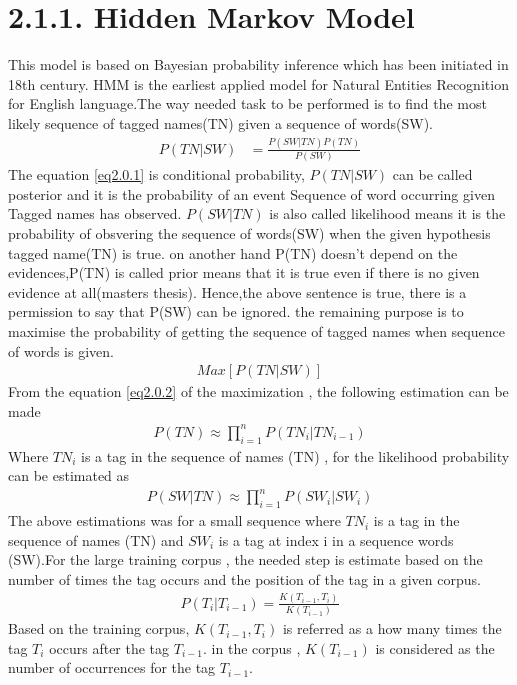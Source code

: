 \section*{2.1.1. Hidden Markov Model}
This model is based on Bayesian probability inference which has been initiated in 18th century. HMM is the earliest applied model for Natural Entities Recognition for English language.The way needed task to be performed is to find the most likely sequence of tagged names(TN) given a sequence of words(SW).
\begin{align}
P(TN|SW) & = \frac{P(SW|TN)P(TN)}{P(SW)}\label{eq2.0.1}
\end{align}
The equation  \eqref{eq2.0.1} is conditional probability, $P(TN|SW)$ can be  called posterior and it is  the probability of an event Sequence of word occurring given Tagged names has observed. 
$P(SW|TN)$ is also called likelihood means it is the probability of obsvering the sequence of words(SW) when the given hypothesis tagged name(TN) is true. on another hand P(TN) doesn't depend on the evidences,P(TN) is called prior means that it is true even if there is no given evidence at all(masters thesis).
Hence,the above sentence is true, there is a permission to say  that P(SW) can be ignored. the remaining purpose is to maximise the probability of getting the sequence of tagged names when sequence of words is given.
\begin{align}
Max\left[P(TN|SW)\right] \label{eq2.0.2}
\end{align}
From the equation  \eqref{eq2.0.2} of the maximization , the following estimation can be made
\begin{align}
P(TN){\approx} \prod_{i=1}^{n} P({TN}_{i}|{TN}_{i-1}) \label{2.0.3}
\end{align}
Where ${TN}_{i}$ is a tag in the sequence of names (TN) , for the likelihood probability can be estimated as 
\begin{align}
P(SW|TN){\approx} \prod_{i=1}^{n} P({SW}_{i}|{SW}_{i})\label{2.0.4}
\end{align}
The above estimations was for a small sequence where ${TN}_{i}$ is a tag in the sequence of names (TN) and ${SW}_{i}$ is a tag at index i in a sequence words (SW).For the large training corpus , the needed step is estimate based on the number of times the tag occurs and the position of the tag in a given corpus.
\begin{align}
P(T_{i}|T_{i-1}) = \frac{K(T_{i-1},T_{i})}{K(T_{i-1})}\label{2.0.5}
\end{align}
Based on the training corpus, $K(T_{i-1},T_{i})$ is referred as a how many times the tag $T_{i}$ occurs after the tag $T_{i-1}$. in the corpus , $K(T_{i-1})$ is considered as the number of occurrences for the tag $T_{i-1}$.

